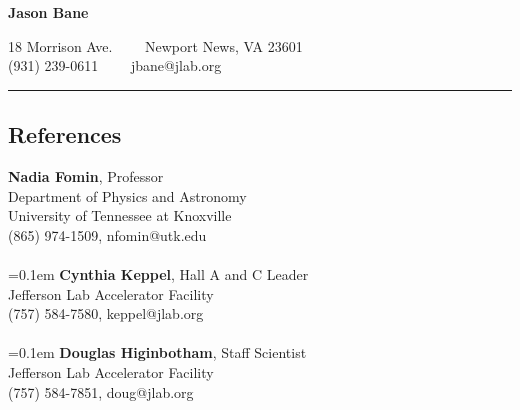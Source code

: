 \documentclass[12pt,letterpaper]{article}
\begin{document}
\begin{center}
{\LARGE \textbf{Jason Bane}}

18 Morrison Ave.\ \ \textbullet
\ \ Newport News, VA 23601 \\
(931) 239-0611\ \ \textbullet
\ \ jbane@jlab.org
\end{center}
\hrule
\subsection*{References}

	{\bf{Nadia Fomin}}, Professor\\
	Department of Physics and Astronomy\\ 
	University of Tennessee at Knoxville\\
	(865) 974-1509, nfomin@utk.edu\\
	\\	
	\parskip=0.1em
	{\noindent\bf{Cynthia Keppel}}, Hall A and C Leader\\
	Jefferson Lab Accelerator Facility\\
	(757) 584-7580, keppel@jlab.org\\
	\\
	\parskip=0.1em
	{\bf{Douglas Higinbotham}}, Staff Scientist\\
	Jefferson Lab Accelerator Facility\\
	(757) 584-7851, doug@jlab.org\\
	\\	
\end{document}
